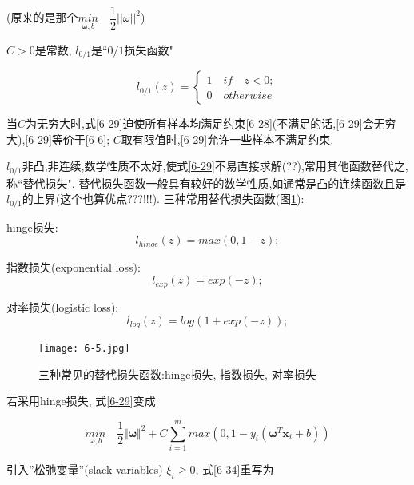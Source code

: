 \documentclass[12pt]{article}
\numberwithin{equation}{section}%
\begin{document}
(原来的是那个${\underset{\boldsymbol{\omega},b}{min}} \quad \dfrac{1}{2}||\omega||^{2}$)

$C>0$是常数, $l_{0/1}$是``$0/1$损失函数"

\begin{equation}
l_{0/1}(z)=
 \left\{ \begin{array}{ll}
1 \quad if  \quad z<0;\\
 0 \quad otherwise
\end{array} \right.
\end{equation}

当$C$为无穷大时,式\ref{6-29}迫使所有样本均满足约束\ref{6-28}(不满足的话,\ref{6-29}会无穷大),\ref{6-29}等价于\ref{6-6}; $C$取有限值时,\ref{6-29}允许一些样本不满足约束.

$l_{0/1}$非凸,非连续,数学性质不太好,使式\ref{6-29}不易直接求解(??),常用其他函数替代之,称``替代损失". 替代损失函数一般具有较好的数学性质,如通常是凸的连续函数且是$l_{0/1}$的上界(这个也算优点???!!!). 三种常用替代损失函数(图\ref{6.5}):

hinge损失: 
\begin{equation}
l_{hinge}(z) = max(0, 1 - z);
\end{equation}

指数损失(exponential loss): 	
\begin{equation}
l_{exp}(z) = exp( - z);
\end{equation}

对率损失(logistic loss): 
\begin{equation}
l_{log}(z) = log(1+exp( - z));
\end{equation}



\begin{figure}
\centering\texttt{[image: 6-5.jpg]}
\caption{三种常见的替代损失函数:hinge损失, 指数损失, 对率损失}
\label{6.5}
\end{figure}

若采用hinge损失, 式\ref{6-29}变成

\begin{equation}
{\underset{\boldsymbol{\omega},b}{min}} \quad \dfrac{1}{2}\Vert \boldsymbol{\omega}\Vert^{2}+C\sum_{i=1}^{m}max(0, 1-y_{i}(\boldsymbol{\omega}^{T}\boldsymbol{x}_{i}+b))
\label{6-34}
\end{equation}

引入''松弛变量''(slack variables) $\xi_{i} \geqslant 0$, 式\ref{6-34}重写为
\end{document}
